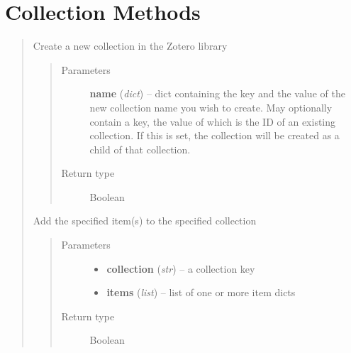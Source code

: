 \documentclass[letterpaper,10pt,english]{sphinxmanual}
\begin{document}
\section{Collection Methods}
\label{index:collection-methods}\begin{quote}

\begin{fulllineitems}
\label{index:pyzotero.zotero.Zotero.create_collection}
Create a new collection in the Zotero library
\begin{quote}\begin{description}
\item[{Parameters}] \leavevmode
\textbf{name} (\emph{dict}) -- dict containing the key  and the value of the new collection name you wish to create. May optionally contain a  key, the value of which is the ID of an existing collection. If this is set, the collection will be created as a child of that collection.

\item[{Return type}] \leavevmode
Boolean

\end{description}\end{quote}

\end{fulllineitems}


\begin{fulllineitems}
\label{index:pyzotero.zotero.Zotero.addto_collection}
Add the specified item(s) to the specified collection
\begin{quote}\begin{description}
\item[{Parameters}] \leavevmode\begin{itemize}
\item {} 
\textbf{collection} (\emph{str}) -- a collection key

\item {} 
\textbf{items} (\emph{list}) -- list of one or more item dicts

\end{itemize}

\item[{Return type}] \leavevmode
Boolean


\end{description}
\end{quote}
\end{fulllineitems}
\end{quote}
\end{document}
